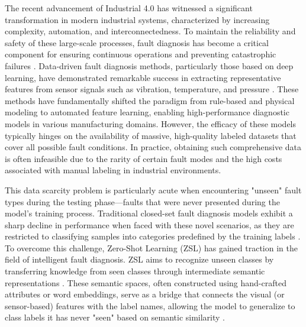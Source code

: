 The recent advancement of Industrial 4.0 has witnessed a significant transformation in modern industrial systems, characterized by increasing complexity, automation, and interconnectedness. To maintain the reliability and safety of these large-scale processes, fault diagnosis has become a critical component for ensuring continuous operations and preventing catastrophic failures \cite{Gao2022, Lei2020}. Data-driven fault diagnosis methods, particularly those based on deep learning, have demonstrated remarkable success in extracting representative features from sensor signals such as vibration, temperature, and pressure \cite{Liu2018}. These methods have fundamentally shifted the paradigm from rule-based and physical modeling to automated feature learning, enabling high-performance diagnostic models in various manufacturing domains. However, the efficacy of these models typically hinges on the availability of massive, high-quality labeled datasets that cover all possible fault conditions. In practice, obtaining such comprehensive data is often infeasible due to the rarity of certain fault modes and the high costs associated with manual labeling in industrial environments.

This data scarcity problem is particularly acute when encountering "unseen" fault types during the testing phase—faults that were never presented during the model's training process. Traditional closed-set fault diagnosis models exhibit a sharp decline in performance when faced with these novel scenarios, as they are restricted to classifying samples into categories predefined by the training labels \cite{Zhang2021}. To overcome this challenge, Zero-Shot Learning (ZSL) has gained traction in the field of intelligent fault diagnosis. ZSL aims to recognize unseen classes by transferring knowledge from seen classes through intermediate semantic representations \cite{Wang2019}. These semantic spaces, often constructed using hand-crafted attributes or word embeddings, serve as a bridge that connects the visual (or sensor-based) features with the label names, allowing the model to generalize to class labels it has never "seen" based on semantic similarity \cite{Lampert2014, Xian2018}.

